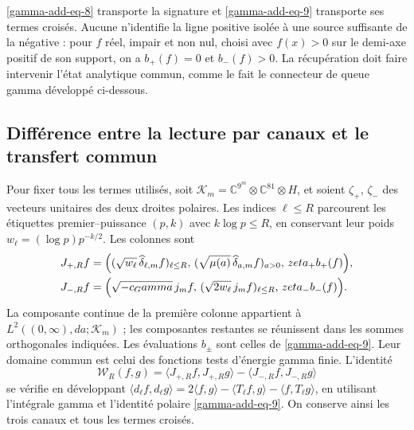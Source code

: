 \eqref{gamma-add-eq-8} transporte la signature et \eqref{gamma-add-eq-9} transporte ses termes croisés. Aucune n'identifie la ligne positive isolée à une source suffisante de la négative : pour \(f\) réel, impair et non nul, choisi avec \(f(x)>0\) sur le demi-axe positif de son support, on a \(b_+(f)=0\) et \(b_-(f)>0\). La récupération doit faire intervenir l'état analytique commun, comme le fait le connecteur de queue gamma développé ci-dessous.

\subsection{Différence entre la lecture par canaux et le transfert commun}
\label{gamma-add-sub-259}

Pour fixer tous les termes utilisés, soit
\(\mathcal K_m=\mathbb C^{9^m}\otimes\mathbb C^{81}\otimes H\),
et soient \(\zeta_+\), \(\zeta_-\) des vecteurs unitaires des deux
droites polaires. Les indices \(\ell\leq R\) parcourent les étiquettes
premier--puissance \((p,k)\) avec \(k\log p\leq R\), en conservant
leur poids \(w_\ell=(\log p)p^{-k/2}\). Les colonnes sont
\begin{equation}
\begin{aligned}
J_{+,R}f={}&\Bigl(
 (\sqrt{w_\ell}\,\widehat\delta_{\ell,m}f)_{\ell\leq R},\,
 (\sqrt{\mu(a)}\,\widehat\delta_{a,m}f)_{a>0},\,
 \zeta_+b_+(f)\Bigr),\\
J_{-,R}f={}&\Bigl(
 \sqrt{-c_\Gamma}\,j_mf,\,
 (\sqrt{2w_\ell}\,j_mf)_{\ell\leq R},\,
 \zeta_-b_-(f)\Bigr).
\end{aligned}
\label{gamma-add-columnas-completas}
\end{equation}
La composante continue de la première colonne appartient à \(L^2((0,\infty),da;\mathcal K_m)\) ; les composantes restantes se réunissent dans les sommes orthogonales indiquées. Les évaluations \(b_\pm\) sont celles de \eqref{gamma-add-eq-9}. Leur domaine commun est celui des fonctions tests d'énergie gamma finie. L'identité
\begin{equation}
\mathscr W_R(f,g)
=\langle J_{+,R}f,J_{+,R}g\rangle
 -\langle J_{-,R}f,J_{-,R}g\rangle
\label{gamma-add-diferencia-columnas}
\end{equation}
se vérifie en développant
\(\langle d_\ell f,d_\ell g\rangle
=2\langle f,g\rangle-\langle T_\ell f,g\rangle
-\langle f,T_\ell g\rangle\), en utilisant l'intégrale gamma
et l'identité polaire \eqref{gamma-add-eq-9}. On conserve ainsi
les trois canaux et tous les termes croisés.

